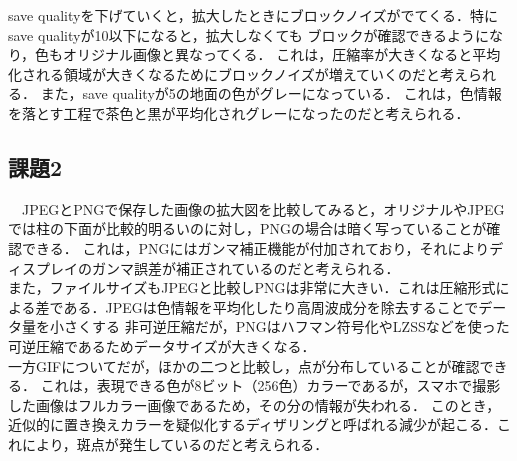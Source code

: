 \documentclass[a4paper,11pt]{bxjsarticle}
\begin{document}
save qualityを下げていくと，拡大したときにブロックノイズがでてくる．特にsave qualityが10以下になると，拡大しなくても
ブロックが確認できるようになり，色もオリジナル画像と異なってくる．
これは，圧縮率が大きくなると平均化される領域が大きくなるためにブロックノイズが増えていくのだと考えられる．
また，save qualityが5の地面の色がグレーになっている．
これは，色情報を落とす工程で茶色と黒が平均化されグレーになったのだと考えられる．


\subsection{課題2}
　JPEGとPNGで保存した画像の拡大図を比較してみると，オリジナルやJPEGでは柱の下面が比較的明るいのに対し，PNGの場合は暗く写っていることが確認できる．
これは，PNGにはガンマ補正機能が付加されており，それによりディスプレイのガンマ誤差が補正されているのだと考えられる．\\
また，ファイルサイズもJPEGと比較しPNGは非常に大きい．これは圧縮形式による差である．JPEGは色情報を平均化したり高周波成分を除去することでデータ量を小さくする
非可逆圧縮だが，PNGはハフマン符号化やLZSSなどを使った可逆圧縮であるためデータサイズが大きくなる．\\
一方GIFについてだが，ほかの二つと比較し，点が分布していることが確認できる．
これは，表現できる色が8ビット（256色）カラーであるが，スマホで撮影した画像はフルカラー画像であるため，その分の情報が失われる．
このとき，近似的に置き換えカラーを疑似化するディザリングと呼ばれる減少が起こる．これにより，斑点が発生しているのだと考えられる．


 
\end{document}
